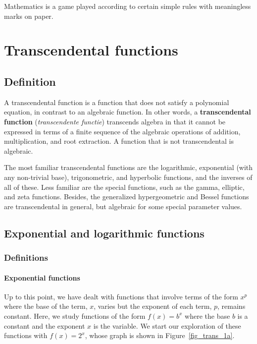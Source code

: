 \begin{savequote}[75mm]
Mathematics is a game played according to certain simple rules with meaningless marks on paper.
\end{savequote}

\chapter{Transcendental functions}
\label{chap_trans}
\graphicspath{{figures/Trans/}}

\section{Definition}
A transcendental function is a function that does not satisfy a polynomial equation, in contrast to an algebraic function. In other words, a \textbf{transcendental function} (\textit{transcendente functie}) transcends algebra in that it cannot be expressed in terms of a finite sequence of the algebraic operations of addition, multiplication, and root extraction. A function that is not transcendental is algebraic.
 

The most familiar transcendental functions are the logarithmic, exponential (with any non-trivial base), trigonometric, and hyperbolic functions, and the inverses of all of these. \ifcourse Less familiar are the special functions, such as the gamma, elliptic, and zeta functions. Besides, the generalized hypergeometric and Bessel functions are transcendental in general, but algebraic for some special parameter values. \fi




\section{Exponential and logarithmic functions}
\label{sec_exponential}
\subsection{Definitions}
\subsubsection{Exponential functions}
 Up to this point, we have dealt with functions that involve terms of the form  $x^{p}$ where the base of the term, $x$, varies but the exponent of each term, $p$, remains constant.  Here, we study functions of the form $f(x) = b^{x}$ where the base $b$ is a constant and the exponent $x$ is the variable.  We start our exploration of these functions with $f(x) = 2^{x}$, whose graph is shown in Figure~\ref{fig_trans_1a}.

